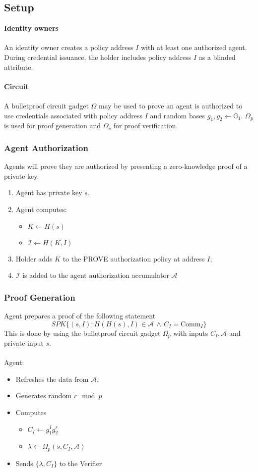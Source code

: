 \documentclass[a4paper]{article}
\begin{document}
\subsection{Setup}
\textbf{Identity owners}\\\\
An identity owner creates a policy address $I$ with at least one authorized agent.
During credential issuance, the holder includes policy address $I$ as a blinded attribute.\\\\
\textbf{Circuit}\\\\
A bulletproof circuit gadget $\Omega$ may be used to prove an agent is authorized to use credentials
associated with policy address $I$ and random bases $g_1,g_2 \leftarrow \mathbb{G}_1$.
$\Omega_p$ is used for proof generation and $\Omega_v$ for proof verification.
\subsubsection{Agent Authorization}
Agents will prove they are authorized by presenting a zero-knowledge proof of a private key.
\begin{enumerate}
    \item Agent has private key $s$.
    \item Agent computes:
    \begin{itemize}
        \item $K \leftarrow H(s)$
        \item $\mathcal{I} \leftarrow H(K, I)$
    \end{itemize}
    \item Holder adds $K$ to the PROVE authorization policy at address $I$;
    \item $\mathcal{I}$ is added to the agent authorization accumulator $\mathcal{A}$
\end{enumerate}

\subsubsection{Proof Generation}
Agent prepares a proof of the following statement
\[
SPK\{(s,I): H(H(s),I)\in \mathcal{A}\,\wedge\,C_I = \mathrm{Comm}_I\}
\]
This is done by using the bulletproof circuit gadget $\Omega_p$ with inputs $C_I,\mathcal{A}$ and private input $s$.\\\\
Agent:
\begin{itemize}
    \item Refreshes the data from $\mathcal{A}$.
    \item Generates random $r \mod p$
    \item Computes
    \begin{itemize}
        \item $C_I \leftarrow g_1^Ig_2^r$
        \item $\lambda \leftarrow \Omega_p(s, C_I, \mathcal{A})$
    \end{itemize}
    \item Sends $\{\lambda, C_I\}$ to the Verifier
\end{itemize}
\end{document}
